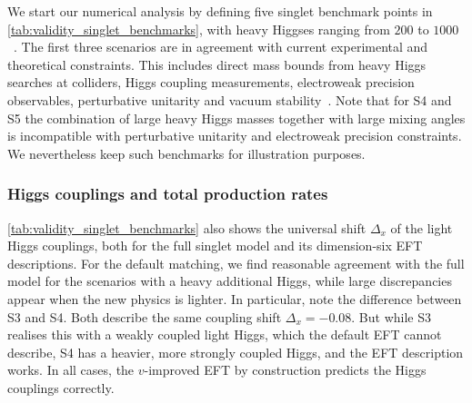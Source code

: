 We start our numerical analysis by defining five singlet benchmark
points in \autoref{tab:validity_singlet_benchmarks}, with heavy Higgses
ranging from $200$ to $1000$~\gev. The first three scenarios are in
agreement with current experimental and theoretical constraints.  This
includes direct mass bounds from heavy Higgs searches at colliders,
Higgs coupling measurements, electroweak precision observables,
perturbative unitarity and vacuum stability~\cite{Pruna:2013bma,
  Lopez-Val:2014jva, Robens:2015gla}. Note that for S4 and S5 the
combination of large heavy Higgs masses together with large mixing
angles is incompatible with perturbative unitarity and electroweak
precision constraints.  We nevertheless keep such benchmarks for
illustration purposes.



\subsubsection{Higgs couplings and total production rates}

\autoref{tab:validity_singlet_benchmarks} also shows the universal
shift $\Delta_x$ of the light Higgs couplings, both for the full
singlet model and its dimension-six EFT descriptions. For the default
matching, we find reasonable agreement with the full model for the
scenarios with a heavy additional Higgs, while large discrepancies
appear when the new physics is lighter. In particular, note the
difference between S3 and S4. Both describe the same coupling shift
$\Delta_x = - 0.08$. But while S3 realises this with a weakly coupled
light Higgs, which the default EFT cannot describe, S4 has a heavier,
more strongly coupled Higgs, and the EFT description works.  In all
cases, the $v$-improved EFT by construction predicts the Higgs
couplings correctly.

